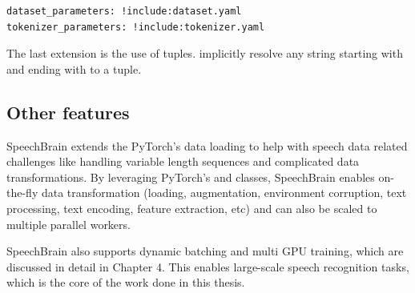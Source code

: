 \begin{verbatim}
dataset_parameters: !include:dataset.yaml
tokenizer_parameters: !include:tokenizer.yaml
\end{verbatim}

The last extension is the use of tuples. implicitly resolve any string starting with \inlinecode{(} and ending with \inlinecode{)} to a tuple.

\subsection{Other features}
SpeechBrain extends the PyTorch's data loading to help with speech data related challenges like handling variable length sequences and complicated data transformations. By leveraging PyTorch's  and  classes, SpeechBrain enables on-the-fly data transformation (loading, augmentation, environment corruption, text processing, text encoding, feature extraction, etc) and can also be scaled to multiple parallel workers.

SpeechBrain also supports dynamic batching and multi GPU training, which are discussed in detail in Chapter 4. This enables large-scale speech recognition tasks, which is the core of the work done in this thesis.  